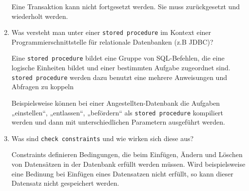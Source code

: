 \documentclass{lehramt-informatik-aufgabe}
\begin{document}
\begin{enumerate}
\begin{liAntwort}
Eine Transaktion kann nicht fortgesetzt werden. Sie muss zurückgesetzt
und wiederholt werden.
\end{liAntwort}


\item Was versteht man unter einer \texttt{stored procedure} im Kontext
einer Programmierschnittstelle für relationale Datenbanken (z.B JDBC)?

\begin{liAntwort}
Eine  \texttt{stored procedure} bildet eine Gruppe von SQL-Befehlen, die
eine logische Einheiten bildet und einer bestimmten Aufgabe zugeordnet
sind. \texttt{stored procedure} werden dazu benutzt eine mehrere
Anweisungen und Abfragen zu koppeln

Beispielsweise können bei einer Angestellten-Datenbank die
Aufgaben „einstellen“, „entlassen“, „befördern“ als \texttt{stored
procedure} kompiliert werden und dann mit unterschiedlichen Parametern
ausgeführt werden.
\end{liAntwort}


\item Was sind \texttt{check constraints} und wie wirken sich diese aus?

\begin{liAntwort}
Constraints definieren Bedingungen, die beim Einfügen, Ändern und
Löschen von Datensätzen in der Datenbank erfüllt werden müssen. Wird
beispielsweise eine Bedinung bei Einfügen eines Datensatzen nicht
erfüllt, so kann dieser Datensatz nicht gespeichert werden.
\end{liAntwort}

\end{enumerate}
\end{document}
